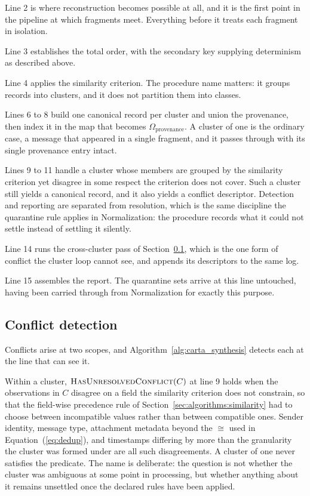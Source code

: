 Line 2 is where reconstruction becomes possible at all, and it is the first point
in the pipeline at which fragments meet. Everything before it treats each fragment
in isolation.

Line 3 establishes the total order, with the secondary key supplying determinism
as described above.

Line 4 applies the similarity criterion. The procedure name matters: it groups
records into clusters, and it does not partition them into classes.

Lines 6 to 8 build one canonical record per cluster and union the provenance, then
index it in the map that becomes $\Omega_{\text{provenance}}$. A cluster of one is
the ordinary case, a message that appeared in a single fragment, and it passes
through with its single provenance entry intact.

Lines 9 to 11 handle a cluster whose members are grouped by the similarity
criterion yet disagree in some respect the criterion does not cover. Such a
cluster still yields a canonical record, and it also yields a conflict descriptor.
Detection and reporting are separated from resolution, which is the same
discipline the quarantine rule applies in Normalization: the procedure records
what it could not settle instead of settling it silently.

Line 14 runs the cross-cluster pass of Section~\ref{sec:algorithms:conflicts},
which is the one form of conflict the cluster loop cannot see, and appends its
descriptors to the same log.

Line 15 assembles the report. The quarantine sets arrive at this line untouched,
having been carried through from Normalization for exactly this purpose.

\subsection{Conflict detection}
\label{sec:algorithms:conflicts}

Conflicts arise at two scopes, and Algorithm~\ref{alg:carta_synthesis} detects
each at the line that can see it.

Within a cluster, $\textsc{HasUnresolvedConflict}(C)$ at line 9 holds when the
observations in $C$ disagree on a field the similarity criterion does not
constrain, so that the field-wise precedence rule of
Section~\ref{sec:algorithms:similarity} had to choose between incompatible
values rather than between compatible ones. Sender identity, message type,
attachment metadata beyond the $\cong$ used in
Equation~(\ref{eq:dedup}), and timestamps differing by more than the granularity
the cluster was formed under are all such disagreements. A cluster of one never
satisfies the predicate. The name is deliberate: the question is not whether the
cluster was ambiguous at some point in processing, but whether anything about it
remains unsettled once the declared rules have been applied.

